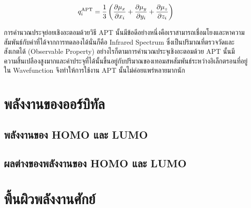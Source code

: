 \begin{enumerate}
          \begin{equation}\label{eq:apt_chage}
              q^{\text{APT}}_{i} = \frac{1}{3} \left( \pdv{\mu_{x}}{x_{i}} + \pdv{\mu_{y}}{y_{i}}
              + \pdv{\mu_{z}}{z_{i}} \right)
          \end{equation}

          การคำนวณประจุย่อยเชิงอะตอมด้วยวิธี APT นั้นมีข้อดีอย่างหนึ่งคือเราสามารถเชื่อมโยงและหาความสัมพันธ์กับค่าที่ได้จากการทดลองได้นั่นก็คือ
          Infrared Spectrum ซึ่งเป็นปริมาณที่ตรวจวัดและสังเกตได้ (Observable Property) อย่างไรก็ตามการคำนวณประจุเชิงอะตอมด้วย APT
          นั้นมีความสิ้นเปลืองสูงมากและค่าประจุที่ได้นั้นขึ้นอยู่กับปริมาณของเทอมสหสัมพันธ์ระหว่างอิเล็กตรอนที่อยู่ใน Wavefunction จึงทำให้การใช้งาน
          APT นั้นไม่ค่อยแพร่หลายมากนัก

\end{enumerate}

\section{พลังงานของออร์บิทัล}
\label{sec:ener_orb}



\subsection{พลังงานของ HOMO และ LUMO}
\label{ssec:ener_homo_lumo}



\subsection{ผลต่างของพลังงานของ HOMO และ LUMO}
\label{sec:ener_diff_orb}


\section{พื้นผิวพลังงานศักย์}
\label{sec:pes}

